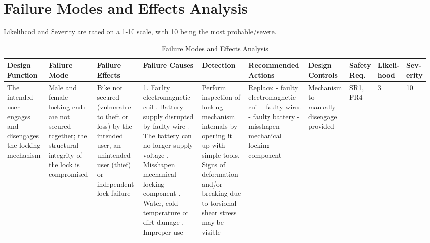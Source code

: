 \documentclass{article}
\begin{document}
\section{Failure Modes and Effects Analysis}
Likelihood and Severity are rated on a 1-10 scale, with 10 being the most probable/severe. 
\begin{table}[H]
\caption{Failure Modes and Effects Analysis}
\tiny
\begin{tabular}{| p{} | p{}  | p{} | p{} | p{} | p{} | p{} | p{} | p{} |p{} | }
\hline
\textbf{Design Function} & \textbf{Failure Mode} & \textbf{Failure \newline Effects} & \textbf{Failure Causes} & \textbf{Detection} & \textbf{Recommended Actions} & \textbf{Design Controls} & \textbf{Safety Req.}  & \textbf{Likeli-hood} & \textbf{Sev-erity}\\ \hline

The \newline intended user \newline engages and \newline disengages the \newline locking \newline mechanism & Male and female \newline locking ends are not \newline secured \newline together; the structural integrity of the lock is compromised & Bike not \newline secured \newline (vulnerable to theft or loss) by the intended user, an unintended user (thief) or independent lock failure & 1. Faulty \newline electromagnetic coil \newline 2. Battery supply \newline disrupted by faulty wire \newline 3. The battery can no longer supply voltage \newline 4. Misshapen mechanical locking component \newline 5. Water, cold \newline temperature or dirt damage \newline 6. Improper use & Perform inspection of locking \newline mechanism \newline internals by \newline opening it up with simple tools. Signs of deformation and/or breaking due to torsional shear stress may be visible & Replace: \newline - faulty \newline electromagnetic coil \newline - faulty wires \newline - faulty battery \newline - misshapen mechanical locking component & Mechanism to manually disengage provided & \hyperref[SR1]{SR1}, %
FR4 & 3 & 10  \\ \hline


\end{tabular}
\end{table}
\end{document}
